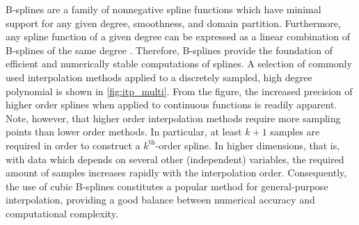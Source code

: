 

B-splines are a family of nonnegative spline functions which have minimal
support for any given degree, smoothness, and domain partition. Furthermore,
any spline function of a given degree can be expressed as a linear combination
of B-splines of the same degree
\parencite[pp.107--110]{stoer2002introduction}. Therefore, B-splines provide
the foundation of efficient and numerically stable computations of splines.
A selection of commonly used interpolation methods applied to a discretely
sampled, high degree polynomial is shown in \cref{fig:itp_multi}. From the
figure, the increased precision of higher order splines when applied to
continuous functions is readily apparent. Note, however, that higher order
interpolation methods require more sampling points than lower order methods.
In particular, at least $k+1$ samples are required in order to construct a
$k^{\text{th}}$-order spline. In higher dimensions, that is, with data which
depends on several other (independent) variables, the required amount of
samples increases rapidly with the interpolation order. Consequently, the use
of cubic B-splines constitutes a popular method for general-purpose
interpolation, providing a good balance between numerical accuracy and
computational complexity.

